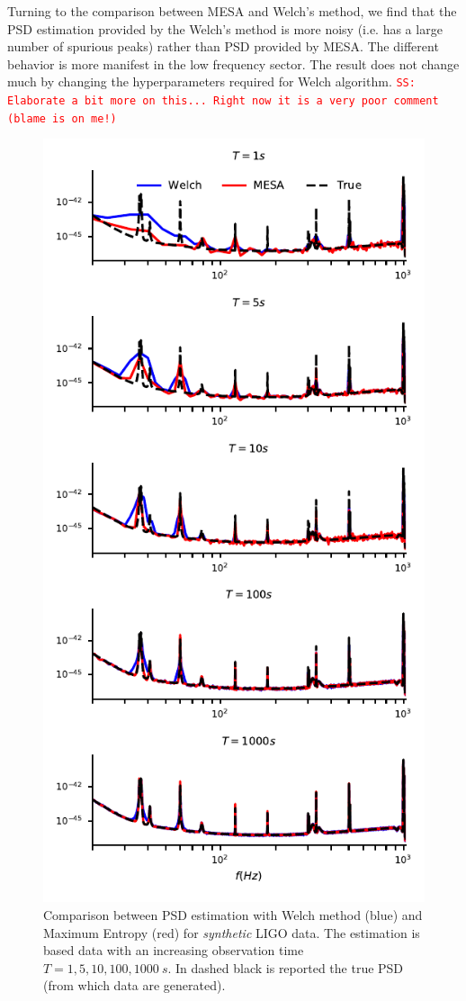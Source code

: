 \documentclass[twocolumn,showpacs,preprintnumbers,nofootinbib,prd,
superscriptaddress,10pt]{revtex4-1}
\newcommand{\sschmidt}[1]{{\textcolor{red}{\texttt{SS: #1}} }}
\begin{document}
Turning to the comparison between MESA and Welch's method, we find that the PSD estimation provided by the Welch's method is more noisy (i.e. has a large number of spurious peaks) rather than PSD provided by MESA. The different behavior is more manifest in the low frequency sector.
The result does not change much by changing the hyperparameters required for Welch algorithm.
\sschmidt{Elaborate a bit more on this... Right now it is a very poor comment (blame is on me!)}


\begin{figure}
	\caption{Comparison between PSD estimation with Welch method (blue) and Maximum Entropy (red) for \textit{synthetic} LIGO data. The estimation is based data with an increasing observation time $T = 1, 5, 10, 100, \SI{1000}{s}$. In dashed black is reported the true PSD (from which data are generated).}
	\label{fig:mem_welch_fakedata}
	\includegraphics{Images/comparison_LVC_data/comparison_LVC_data_overall_fake_True.pdf}

\end{figure}
\end{document}
